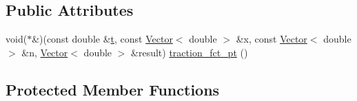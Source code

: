 \subsection*{Public Attributes}
\begin{DoxyCompactItemize}
\item 
void($\ast$\&)(const double \&\hyperlink{cfortran_8h_af6f0bd3dc13317f895c91323c25c2b8f}{t}, const \hyperlink{classoomph_1_1Vector}{Vector}$<$ double $>$ \&x, const \hyperlink{classoomph_1_1Vector}{Vector}$<$ double $>$ \&n, \hyperlink{classoomph_1_1Vector}{Vector}$<$ double $>$ \&result) \hyperlink{classoomph_1_1NavierStokesTractionElement_a97b29ab7568f8b93982fda56043449b6}{traction\+\_\+fct\+\_\+pt} ()
\end{DoxyCompactItemize}
\subsection*{Protected Member Functions}
